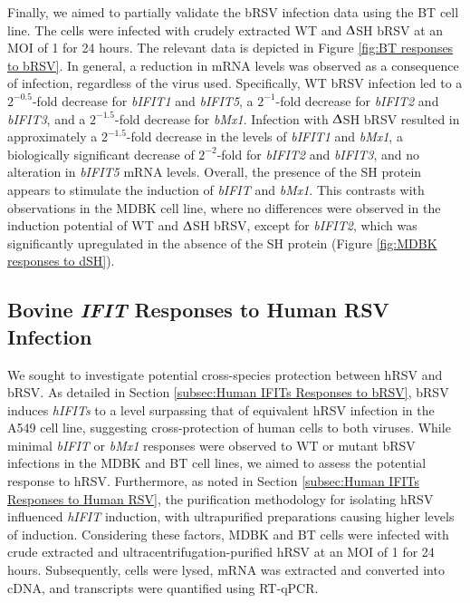 Finally, we aimed to partially validate the bRSV infection data using the BT cell line. The cells were infected with crudely extracted WT and $\Updelta$SH bRSV at an MOI of 1 for 24 hours. The relevant data is depicted in Figure \ref{fig:BT responses to bRSV}.  In general, a reduction in mRNA levels was observed as a consequence of infection, regardless of the virus used. Specifically, WT bRSV infection led to a \(2^{-0.5}\)-fold decrease for \textit{bIFIT1} and \textit{bIFIT5}, a \(2^{-1}\)-fold decrease for \textit{bIFIT2} and \textit{bIFIT3}, and a \(2^{-1.5}\)-fold decrease for \textit{bMx1}. Infection with $\Updelta$SH bRSV resulted in approximately a \(2^{-1.5}\)-fold decrease in the levels of \textit{bIFIT1} and \textit{bMx1}, a biologically significant decrease of \(2^{-2}\)-fold for \textit{bIFIT2} and \textit{bIFIT3}, and no alteration in \textit{bIFIT5} mRNA levels. Overall, the presence of the SH protein appears to stimulate the induction of \textit{bIFIT} and \textit{bMx1}. This contrasts with observations in the MDBK cell line, where no differences were observed in the induction potential of WT and $\Updelta$SH bRSV, except for \textit{bIFIT2}, which was significantly upregulated in the absence of the SH protein (Figure \ref{fig:MDBK responses to dSH}).

\subsection{Bovine \textit{IFIT} Responses to Human RSV Infection} \label{subsec:Bovine IFITs Responses to hRSV Infection}
We sought to investigate potential cross-species protection between hRSV and bRSV. As detailed in Section \ref{subsec:Human IFITs Responses to bRSV}, bRSV induces \textit{hIFITs} to a level surpassing that of equivalent hRSV infection in the A549 cell line, suggesting cross-protection of human cells to both viruses. While minimal \textit{bIFIT} or \textit{bMx1} responses were observed to WT or mutant bRSV infections in the MDBK and BT cell lines, we aimed to assess the potential response to hRSV. Furthermore, as noted in Section \ref{subsec:Human IFITs Responses to Human RSV}, the purification methodology for isolating hRSV influenced \textit{hIFIT} induction, with ultrapurified preparations causing higher levels of induction. Considering these factors, MDBK and BT cells were infected with crude extracted and ultracentrifugation-purified hRSV at an MOI of 1 for 24 hours. Subsequently, cells were lysed, mRNA was extracted and converted into cDNA, and transcripts were quantified using RT-qPCR.

